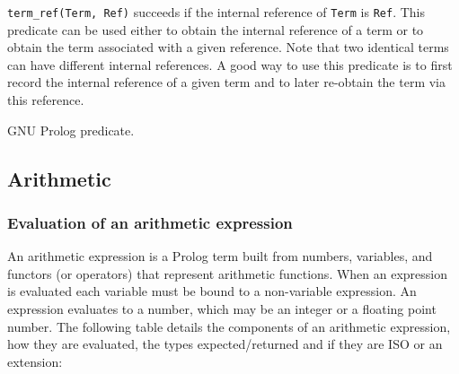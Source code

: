 \texttt{term\_ref(Term, Ref)} succeeds if the internal reference of
\texttt{Term} is \texttt{Ref}. This predicate can be used either to obtain
the internal reference of a term or to obtain the term associated with a given
reference. Note that two identical terms can have different internal
references. A good way to use this predicate is to first record the internal
reference of a given term and to later re-obtain the term via this
reference.

\begin{PlErrors}




\end{PlErrors}

\Portability

GNU Prolog predicate.

\subsection{Arithmetic}

\subsubsection{Evaluation of an arithmetic expression}
\label{Evaluation-of-an-arithmetic-expression}
An arithmetic expression is a Prolog term built from numbers,
variables, and functors (or operators) that represent arithmetic functions.
When an expression is evaluated each variable must be bound to a
non-variable expression. An expression evaluates to a number, which may be
an integer or a floating point number. The following table details the
components of an arithmetic expression, how they are evaluated, the types
expected/returned and if they are ISO or an extension:


\newpage
{}

